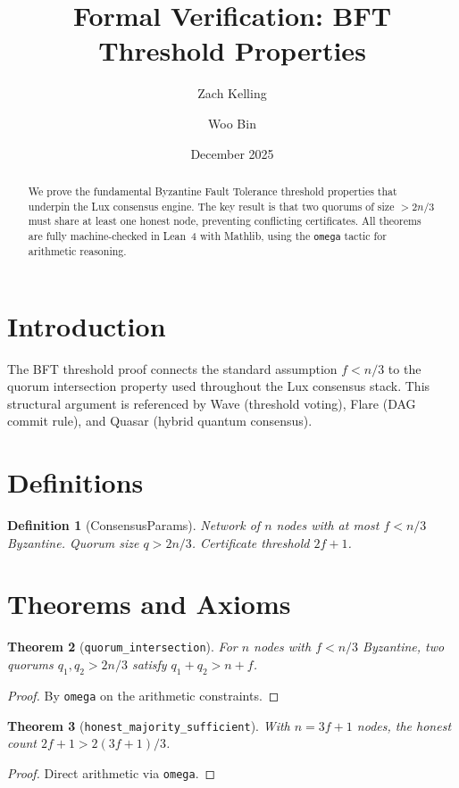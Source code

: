 \documentclass[11pt]{article}
\title{Formal Verification: BFT Threshold Properties}
\author{Zach Kelling \and Woo Bin}
\date{December 2025}
\newtheorem{theorem}{Theorem}
\newtheorem{definition}[theorem]{Definition}
\begin{document}
\maketitle

\begin{abstract}
We prove the fundamental Byzantine Fault Tolerance threshold properties that underpin the Lux consensus engine. The key result is that two quorums of size $> 2n/3$ must share at least one honest node, preventing conflicting certificates. All theorems are fully machine-checked in Lean~4 with Mathlib, using the \texttt{omega} tactic for arithmetic reasoning.
\end{abstract}

\section{Introduction}
The BFT threshold proof connects the standard assumption $f < n/3$ to the quorum intersection property used throughout the Lux consensus stack. This structural argument is referenced by Wave (threshold voting), Flare (DAG commit rule), and Quasar (hybrid quantum consensus).

\section{Definitions}
\begin{definition}[ConsensusParams]
Network of $n$ nodes with at most $f < n/3$ Byzantine. Quorum size $q > 2n/3$. Certificate threshold $2f+1$.
\end{definition}


\section{Theorems and Axioms}
\begin{theorem}[\texttt{quorum\_intersection}]
For $n$ nodes with $f < n/3$ Byzantine, two quorums $q_1, q_2 > 2n/3$ satisfy $q_1 + q_2 > n + f$.
\end{theorem}
\begin{proof}
By \texttt{omega} on the arithmetic constraints.
\end{proof}

\begin{theorem}[\texttt{honest\_majority\_sufficient}]
With $n = 3f+1$ nodes, the honest count $2f+1 > 2(3f+1)/3$.
\end{theorem}
\begin{proof}
Direct arithmetic via \texttt{omega}.
\end{proof}
\end{document}
